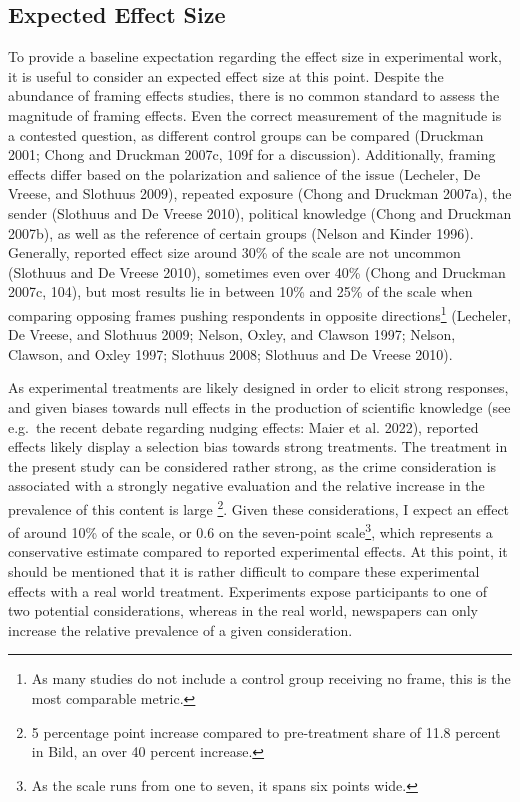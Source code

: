 \documentclass[
  12pt,
]{article}
\begin{document}
\hypertarget{expected-effect-size}{%
\subsection{Expected Effect Size}\label{expected-effect-size}}

To provide a baseline expectation regarding the effect size in experimental work, it is useful to consider an expected effect size at this point. Despite the abundance of framing effects studies, there is no common standard to assess the magnitude of framing effects. Even the correct measurement of the magnitude is a contested question, as different control groups can be compared (Druckman 2001; Chong and Druckman 2007c, 109f for a discussion). Additionally, framing effects differ based on the polarization and salience of the issue (Lecheler, De Vreese, and Slothuus 2009), repeated exposure (Chong and Druckman 2007a), the sender (Slothuus and De Vreese 2010), political knowledge (Chong and Druckman 2007b), as well as the reference of certain groups (Nelson and Kinder 1996). Generally, reported effect size around 30\% of the scale are not uncommon (Slothuus and De Vreese 2010), sometimes even over 40\% (Chong and Druckman 2007c, 104), but most results lie in between 10\% and 25\% of the scale when comparing opposing frames pushing respondents in opposite directions\footnote{As many studies do not include a control group receiving no frame, this is the most comparable metric.} (Lecheler, De Vreese, and Slothuus 2009; Nelson, Oxley, and Clawson 1997; Nelson, Clawson, and Oxley 1997; Slothuus 2008; Slothuus and De Vreese 2010).

As experimental treatments are likely designed in order to elicit strong responses, and given biases towards null effects in the production of scientific knowledge (see e.g.~the recent debate regarding nudging effects: Maier et al. 2022), reported effects likely display a selection bias towards strong treatments. The treatment in the present study can be considered rather strong, as the crime consideration is associated with a strongly negative evaluation and the relative increase in the prevalence of this content is large \footnote{5 percentage point increase compared to pre-treatment share of 11.8 percent in Bild, an over 40 percent increase.}. Given these considerations, I expect an effect of around 10\% of the scale, or 0.6 on the seven-point scale\footnote{As the scale runs from one to seven, it spans six points wide.}, which represents a conservative estimate compared to reported experimental effects. At this point, it should be mentioned that it is rather difficult to compare these experimental effects with a real world treatment. Experiments expose participants to one of two potential considerations, whereas in the real world, newspapers can only increase the relative prevalence of a given consideration.
\end{document}
